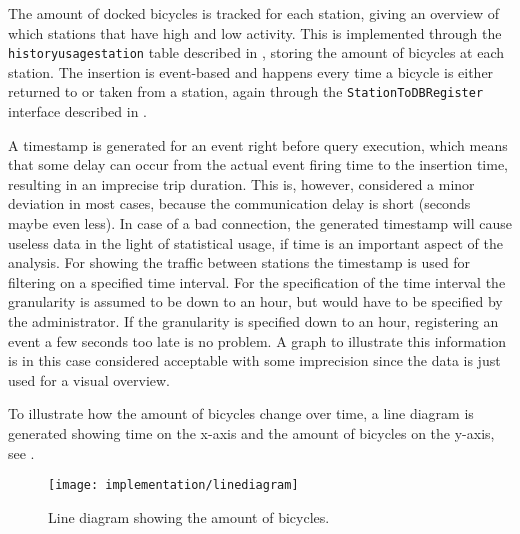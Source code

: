 The amount of docked bicycles is tracked for each station, giving an overview of which stations that have high and low activity.
This is implemented through the \texttt{historyusagestation} table described in , storing the amount of bicycles at each station.
The insertion is event-based and happens every time a bicycle is either returned to or taken from a station, again through the \texttt{StationToDBRegister} interface described in .

A timestamp is generated for an event right before query execution, which means that some delay can occur from the actual event firing time to the insertion time, resulting in an imprecise trip duration. 
This is, however, considered a minor deviation in most cases, because the communication delay is short (seconds maybe even less).
In case of a bad connection, the generated timestamp will cause useless data in the light of statistical usage, if time is an important aspect of the analysis.
For showing the traffic between stations the timestamp is used for filtering on a specified time interval.
For the specification of the time interval the granularity is assumed to be down to an hour, but would have to be specified by the administrator.
If the granularity is specified down to an hour, registering an event a few seconds too late is no problem.
A graph to illustrate this information is in this case considered acceptable with some imprecision since the data is just used for a visual overview.

To illustrate how the amount of bicycles change over time, a line diagram is generated showing time on the x-axis and the amount of bicycles on the y-axis, see .
\begin{figure}[h]
\centering
\texttt{[image: implementation/linediagram]}
\caption{Line diagram showing the amount of bicycles.}\label{fig:linediagram}
\end{figure}

